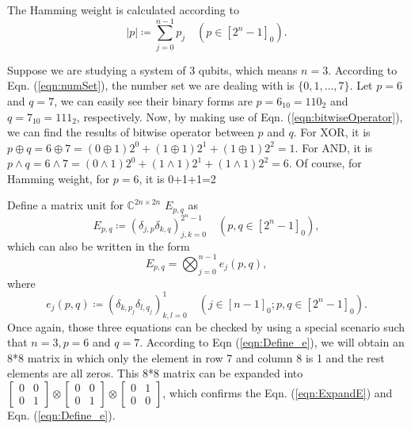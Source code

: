 The Hamming weight is calculated according to
\begin{equation}
    |p|\coloneqq\sum_{j=0}^{n-1}p_j\quad(p\in[2^n-1]_0).
    \label{eqn:Hamming}
\end{equation}
\begin{example}
    Suppose we are studying a system of 3 qubits, which means $n=3$. According to Eqn. (\ref{eqn:numSet}), the number set we are dealing with is $\{0, 1, \dots, 7\}$. Let $p=6$ and $q=7$, we can easily see their binary forms are $p=6_{10}=110_2$ and $q=7_{10}=111_2$, respectively. Now, by making use of Eqn. (\ref{eqn:bitwiseOperator}), we can find the results of bitwise operator between $p$ and $q$. For XOR, it is $p\oplus q=6\oplus7=(0\oplus1)2^0+(1\oplus1)2^1+(1\oplus1)2^2=1$. For AND, it is $p\wedge q=6\wedge7=(0\wedge1)2^0+(1\wedge1)2^1+(1\wedge1)2^2=6$. Of course, for Hamming weight, for $p=6$, it is 0+1+1=2
    \label{exp:6.1}
\end{example}
Define a matrix unit for $\mathbb{C}^{2n\times2n}$ $E_{p,q}$ as
\begin{equation}
    E_{p,q}\coloneqq(\delta_{j,p}\delta_{k,q})_{j,k=0}^{2^n-1}\quad(p,q\in[2^n-1]_0),
    \label{eqn:MatrixUnit}
\end{equation}
which can also be written in the form
\begin{equation}
    E_{p,q}=\bigotimes_{j=0}^{n-1}e_j(p,q),
    \label{eqn:ExpandE}
\end{equation}
where
\begin{equation}
    e_j(p,q)\coloneqq(\delta_{k,p_j}\delta_{l,q_j})_{k,l=0}^1 \quad (j\in[n-1]_0;p,q\in[2^n-1]_0).
    \label{eqn:Define_e}
\end{equation}
Once again, those three equations can be checked by using a special scenario such that $n=3, p=6$ and $q=7$. According to Eqn (\ref{eqn:Define_e}), we will obtain an 8*8 matrix in which only the element in row 7 and column 8 is 1 and the rest elements are all zeros. This 8*8 matrix can be expanded into $\begin{bmatrix}
    0&0\\0&1
\end{bmatrix}\otimes\begin{bmatrix}
    0&0\\0&1
\end{bmatrix}\otimes\begin{bmatrix}
    0&1\\0&0
\end{bmatrix}$, which confirms the Eqn. (\ref{eqn:ExpandE}) and Eqn. (\ref{eqn:Define_e}).
